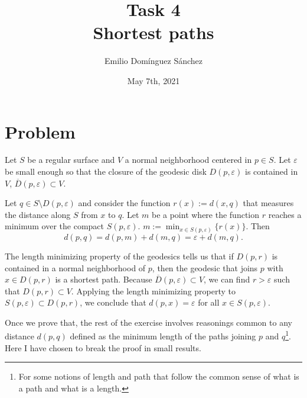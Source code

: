 \documentclass[
	12pt, %
]{fphw}
\title{Task 4 \\ Shortest paths} %
\author{Emilio Domínguez Sánchez} %
\date{May 7th, 2021} %
\institute{University of Murcia \\ Faculty of Mathematics} %
\newcommand{\clsr}[1]{\overline{#1}}
\begin{document}
\maketitle %


\section*{Problem}

\begin{problem}
    Let $S$ be a regular surface and
    $V$ a normal neighborhood centered in $p \in S$.
    Let $ε$ be small enough so that the closure of the geodesic disk $D(p, ε)$
    is contained in $V$, $\clsr{D}(p, ε) \subset V$.

    Let $q \in S \setminus D(p, ε)$ and consider the function $r(x) := d(x, q)$
    that measures the distance along $S$ from $x$ to $q$.
    Let $m$ be a point where the function $r$ reaches a minimum
    over the compact $S(p, ε)$.
    $m := \min_{x \in S(p, ε)} \{r(x)\}$.
    Then
    \begin{equation*}
        d(p, q) = d(p, m) + d(m, q) = ε + d(m, q).
    \end{equation*}
\end{problem}


The length minimizing property of the geodesics tells us that if $D(p,r)$
is contained in a normal neighborhood of $p$,
then the geodesic that joins $p$ with $x \in D(p,r)$ is a shortest path.
Because $\clsr{D}(p,ε) \subset V$, we can find $r > ε$ such that $D(p,r) \subset V$.
Applying the length minimizing property to $S(p,ε) \subset D(p,r)$,
we conclude that $d(p,x) = ε$ for all $x \in S(p,ε)$.

Once we prove that, the rest of the exercise involves reasonings
common to any distance $d(p,q)$ defined as
the minimum length of the paths joining $p$ and $q$\footnote{
    For some notions of length and path that follow the common sense of
    what is a path and what is a length.
}.
Here I have chosen to break the proof in small results.
\end{document}
